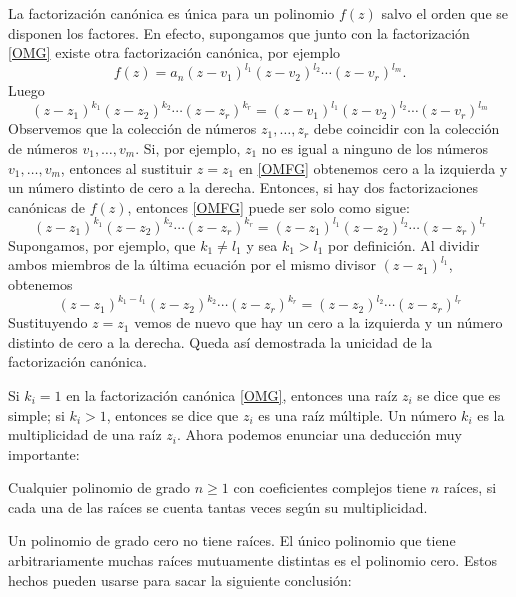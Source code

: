La factorización canónica es única para un polinomio $f(z)$ salvo el orden que se disponen los factores. En efecto, supongamos que junto con la factorización \eqref{OMG} existe otra factorización canónica, por ejemplo
$$f(z)=a_n (z-v_1)^{l_1}(z-v_2)^{l_2} \cdots (z-v_r)^{l_m}.$$
Luego
\begin{equation}
    (z-z_1)^{k_1}(z-z_2)^{k_2} \cdots (z-z_r)^{k_r} = (z-v_1)^{l_1}(z-v_2)^{l_2} \cdots (z-v_r)^{l_m} \label{OMFG}
\end{equation}
Observemos que la colección de números $z_1,  \dots,  z_r$ debe coincidir con la colección de números $v_1,  \dots,  v_m$. Si, por ejemplo, $z_1$ no es igual a ninguno de los números $v_1,  \dots,  v_m$, entonces al sustituir $z = z_1$ en \eqref{OMFG} obtenemos cero a la izquierda y un número distinto de cero a la derecha. Entonces, si hay dos factorizaciones canónicas de $f(z)$, entonces \eqref{OMFG} puede ser solo como sigue:
$$(z-z_1)^{k_1}(z-z_2)^{k_2} \cdots (z-z_r)^{k_r} = (z-z_1)^{l_1}(z-z_2)^{l_2} \cdots (z-z_r)^{l_r}$$
Supongamos, por ejemplo, que $k_1 \neq l_1$ y sea $k_1 > l_1$ por definición. Al dividir ambos miembros de la última ecuación por el mismo divisor $(z - z_1)^{l_1}$, obtenemos
$$(z-z_1)^{k_1-l_1}(z-z_2)^{k_2} \cdots (z-z_r)^{k_r} = (z-z_2)^{l_2} \cdots (z-z_r)^{l_r}$$
Sustituyendo $z = z_1$ vemos de nuevo que hay un cero a la izquierda y un número distinto de cero a la derecha. Queda así demostrada la unicidad de la factorización canónica.

Si $k_i = 1$ en la factorización canónica \eqref{OMG}, entonces una raíz $z_i$ se dice que es simple; si $k_i > 1$, entonces se dice que $z_i$ es una raíz múltiple. Un número $k_i$ es la multiplicidad de una raíz $z_i$. Ahora podemos enunciar una deducción muy importante:

\begin{tcolorbox}[
        theorem style=change break,
        enhanced,
        breakable,
        boxrule=0pt,
        frame hidden,
        borderline west={3pt}{0pt}{black},
        colback=gray!20,
        coltitle=gray!90,
        attach title to upper={\ },
        sharp corners,
        fonttitle=\bfseries,
        fontupper=\normalsize
    ]
    Cualquier polinomio de grado $n \geq 1$ con coeficientes complejos tiene $n$ raíces, si cada una de las raíces se cuenta tantas veces según su multiplicidad.\label{CONSECUENCIA1_FUNDAMENTAL}
\end{tcolorbox}

Un polinomio de grado cero no tiene raíces. El único polinomio que tiene arbitrariamente muchas raíces mutuamente distintas es el polinomio cero. Estos hechos pueden usarse para sacar la siguiente conclusión:

